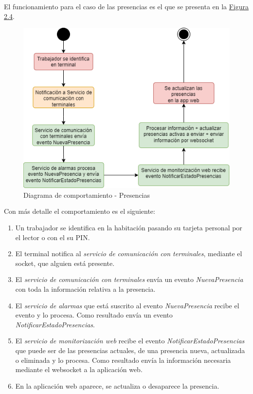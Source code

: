 \newpage
El funcionamiento para el caso de las presencias es el que se presenta en la \hyperref[fig:flujograma-alarmas]{Figura 2.4}.

\begin{figure}[H]
    \centering
    \includegraphics[width=12cm]{Imagenes/Flujograma-presencias.png}
    \caption{Diagrama de comportamiento - Presencias}
    \label{fig:flujograma-presencias}
\end{figure}

Con más detalle el comportamiento es el siguiente:
\begin{enumerate}
	\item Un trabajador se identifica en la habitación pasando su tarjeta personal por el lector o con el su PIN.
	\item El terminal notifica al \textit{servicio de comunicación con terminales}, mediante el socket, que alguien está presente.
	\item El \textit{servicio de comunicación con terminales} envía un evento \textit{NuevaPresencia} con toda la información relativa a la presencia.
	\item El \textit{servicio de alarmas} que está suscrito al evento \textit{NuevaPresencia} recibe el evento y lo procesa. Como resultado envía un evento \textit{NotificarEstadoPresencias}.
	\item El \textit{servicio de monitorización web} recibe el evento \textit{NotificarEstadoPresencias} que puede ser de las presencias actuales, de una presencia nueva, actualizada o eliminada y lo procesa. Como resultado envía la información necesaria mediante el websocket a la aplicación web.
	\item En la aplicación web aparece, se actualiza o desaparece la presencia.
\end{enumerate}

